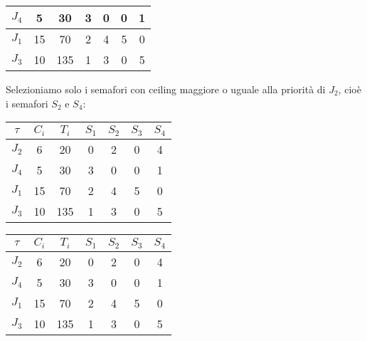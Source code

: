 \begin{Esercizio1}
\begin{table}[h]
\begin{tabular}{|c|c|c|c|c|c|c|}
\arrayrulecolor{red}\hline
\arrayrulecolor{black}

$J_4$ & 5 & 30 & 3 & 0 & 0 & 1 \\
\hline
$J_1$ & 15 & 70 & 2 & 4 & 5 & 0 \\
\hline
$J_3$ & 10 & 135 & 1 & 3 & 0 & 5 \\
\hline
\end{tabular}
\label{tab:task_periodici}
\end{table}

Selezioniamo solo i semafori con ceiling maggiore o uguale
alla priorità di \(J_{2}\), cioè i semafori \(S_{2}\) e \(S_{4}\):






\begin{table}[H]
\centering
\begin{tabular}{|c|c|c|c|c|c|c|}
\hline
\(\tau\) & $C_i$ & $T_i$ & $S_1$ &  \cellcolor{blue!20} $S_2$ & $S_3$ & \cellcolor{blue!20} $S_4$ \\
\hline
$J_2$ & 6 & 20 & 0 & 2 & 0 & 4 \\

\arrayrulecolor{red}\hline
\arrayrulecolor{black}

$J_4$ & 5 & 30 & 3 & 0 & 0 & 1 \\
\hline
$J_1$ & 15 & 70 & 2 & 4 & 5 & 0 \\
\hline
$J_3$ & 10 & 135 & 1 & 3 & 0 & 5 \\
\hline
\end{tabular}
\label{tab:task_periodici}
\end{table}


\begin{table}[H]
\centering
\begin{tabular}{|c|c|c|c|c|c|c|}
\hline
\(\tau\) & $C_i$ & $T_i$ & $S_1$ & $S_2$ & $S_3$ & $S_4$ \\
\hline
$J_2$ & 6 & 20 & 0 & 2 & 0 & 4 \\

\arrayrulecolor{red}\hline
\arrayrulecolor{black}

$J_4$ & 5 & 30 & 3 & \cellcolor{blue!20}0 & 0 & \cellcolor{blue!20}1 \\
\hline
$J_1$ & 15 & 70 & 2 & \cellcolor{blue!20}4 & 5 & \cellcolor{blue!20}0 \\
\hline
$J_3$ & 10 & 135 & 1 & \cellcolor{blue!20}3 & 0 & \cellcolor{blue!20}5 \\
\hline
\end{tabular}
\label{tab:task_periodici}
\end{table}






\end{Esercizio1}
